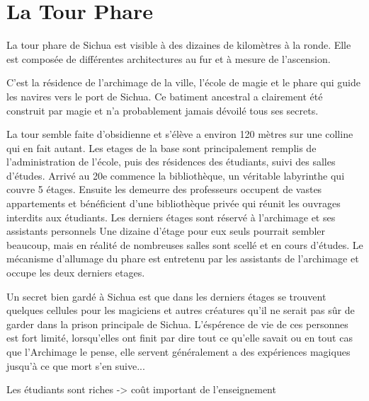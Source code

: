 \section{La Tour Phare}

La tour phare de Sichua est visible à des dizaines de kilomètres à la ronde.
Elle est composée de différentes architectures au fur et à mesure de l'ascension.


C'est la résidence de l'archimage de la ville, l'école de magie et le 
phare qui guide les navires vers le port de Sichua. Ce batiment ancestral
a clairement été construit par magie et n'a probablement jamais dévoilé
tous ses secrets.

La tour semble faite d'obsidienne et s'élève a environ 120 mètres sur une 
colline qui en fait autant. Les etages de la base sont principalement 
remplis de l'administration de l'école, puis des résidences des étudiants, 
suivi des salles d'études. Arrivé au 20e commence la bibliothèque, un 
véritable labyrinthe qui couvre 5 étages. Ensuite les demeurre des 
professeurs occupent de vastes appartements et bénéficient d'une 
bibliothèque privée qui réunit les ouvrages interdits aux étudiants.
Les derniers étages sont réservé à l'archimage et ses assistants personnels
Une dizaine d'étage pour eux seuls pourrait sembler beaucoup, mais en 
réalité de nombreuses salles sont scellé et en cours d'études. Le mécanisme
d'allumage du phare est entretenu par les assistants de l'archimage et 
occupe les deux derniers etages.

Un secret bien gardé à Sichua est que dans les derniers étages
se trouvent quelques cellules pour les magiciens et autres créatures
qu'il ne serait pas sûr de garder dans la prison principale de Sichua.
L'éspérence de vie de ces personnes est fort limité, lorsqu'elles ont finit
par dire tout ce qu'elle savait ou en tout cas que l'Archimage le pense,
elle servent généralement a des expériences magiques jusqu'à ce que mort
s'en suive...

Les étudiants sont riches -> coût important de l'enseignement

